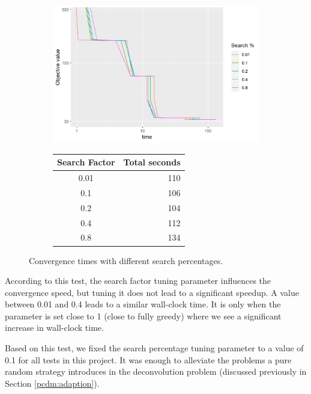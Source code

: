 \begin{figure}[h]
	\centering
	\begin{subfigure}{0.6\linewidth}
		\includegraphics[width=1.0\linewidth]{./chapters/05.pcdm/parameters/searchPercent.png}
	\end{subfigure}
	\begin{subfigure}{0.35\linewidth}
		\begin{tabular}{c | r}
			Search Factor & Total seconds \\ \hline
			0.01 & 110 \\
			0.1 & 106 \\
			0.2 & 104 \\
			0.4 & 112 \\
			0.8 & 134 \\
		\end{tabular}
	\end{subfigure}
	\caption{Convergence times with different search percentages.}
	\label{pcdm:results:search}
\end{figure}

According to this test, the search factor tuning parameter influences the convergence speed, but tuning it does not lead to a significant speedup. A value between 0.01 and 0.4 leads to a similar wall-clock time. It is only when the parameter is set close to 1 (close to fully greedy) where we see a significant increase in wall-clock time.

Based on this test, we fixed the search percentage tuning parameter to a value of 0.1 for all tests in this project. It was enough to alleviate the problems a pure random strategy introduces in the deconvolution problem (discussed previously in Section \ref{pcdm:adaption}).

